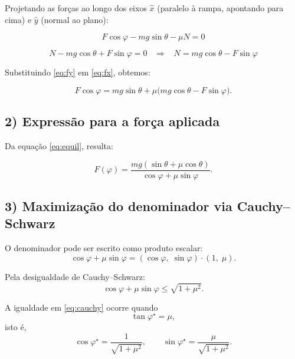 \documentclass[a4paper,12pt]{article}
\begin{document}
\begin{flushleft}
Projetando as forças ao longo dos eixos $\hat{x}$ (paralelo à rampa, apontando para cima) e $\hat{y}$ (normal ao plano):

\begin{equation}\label{eq:fx}
F\cos\varphi - mg\sin\theta - \mu N = 0
\end{equation}

\begin{equation}\label{eq:fy}
N - mg\cos\theta + F\sin\varphi = 0
\;\;\;\Rightarrow\;\;\;
N = mg\cos\theta - F\sin\varphi
\end{equation}

Substituindo \eqref{eq:fy} em \eqref{eq:fx}, obtemos:

\begin{equation}\label{eq:equil}
F\cos\varphi = mg\sin\theta + \mu\bigl(mg\cos\theta - F\sin\varphi\bigr).
\end{equation}

\subsection*{2) Expressão para a força aplicada}

Da equação \eqref{eq:equil}, resulta:

\begin{equation}\label{eq:fphi}
F(\varphi) = \frac{mg(\sin\theta + \mu\cos\theta)}{\cos\varphi + \mu\sin\varphi}.
\end{equation}

\subsection*{3) Maximização do denominador via Cauchy--Schwarz}

O denominador pode ser escrito como produto escalar:
\[
\cos\varphi + \mu\sin\varphi = (\cos\varphi,\;\sin\varphi)\cdot(1,\;\mu).
\]

Pela \colorbox{yellow!30}{desigualdade de Cauchy--Schwarz}:
\begin{equation}\label{eq:cauchy}
\boxed{
\cos\varphi + \mu\sin\varphi \le \sqrt{1+\mu^2}.
}
\end{equation}

A igualdade em \eqref{eq:cauchy} ocorre quando
\begin{equation}\label{eq:tanphi}
\tan\varphi^\star = \mu,
\end{equation}
isto é,
\[
\cos\varphi^\star = \frac{1}{\sqrt{1+\mu^2}},\qquad
\sin\varphi^\star = \frac{\mu}{\sqrt{1+\mu^2}}.
\]


\end{flushleft}
\end{document}
